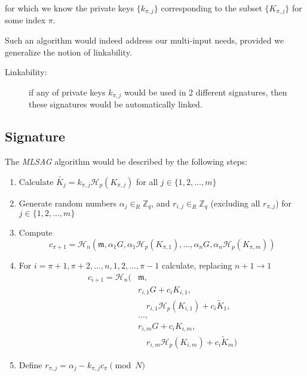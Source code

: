 for which we know
the private keys \(\{k_{\pi, j} \} \) corresponding to the subset \(\{K_{\pi, j}\} \) for some index \(\pi\). 

Such an algorithm would indeed address our multi-input needs, provided we generalize the notion of linkability.

\begin{description}
	\item[Linkability:] if any of private keys \(k_{\pi, j}\) would be used in 2 different signatures, then these signatures would be automatically linked.
\end{description}



\subsection*{Signature}

The {\em MLSAG} algorithm would be described by the following steps:

\begin{enumerate}
	
	\item Calculate \(\tilde{K_j} = k_{\pi, j} \mathcal{H}_p(K_{\pi, j})\) for all \(j \in \{1, 2, ..., m\}\)
	
	\item Generate random numbers  \(\alpha_j \in_R \mathbb{Z}_q\), and \(r_{i, j} \in_R \mathbb{Z}_q\) (excluding all \(r_{\pi, j}\)) for \(j \in \{1, 2, ..., m\}\) 
	
	\item Compute 
	\[
	c_{\pi+1} = \mathcal{H}_n(\mathfrak{m}, \alpha_1 G, \alpha_1 \mathcal{H}_p(K_{\pi, 1}), ..., \alpha_n G, \alpha_n \mathcal{H}_p(K_{\pi, m}))
	\]
	
	\item For \(i = \pi+1, \pi+2, ..., n, 1, 2, ..., \pi-1\) calculate, replacing \(n + 1 \rightarrow 1\)
	\begin{align*}
	  c_{i+1} = \mathcal{H}_n(&\mathfrak{m},\\
	                          & r_{i, 1} G + c_i K_{i, 1}, \\
	                          & \quad r_{i, 1} \mathcal{H}_p(K_{i, 1}) + c_i \tilde{K}_1,\\ 
	                          &..., \\
	                          & r_{i, m} G + c_i K_{i, m}, \\
	                          & \quad r_{i, m} \mathcal{H}_p(K_{i, m}) + c_i \tilde{K}_m)
	\end{align*} 
	
	
	\item Define \(r_{\pi, j} = \alpha_j -k_{\pi, j} c_\pi \pmod N\)
	
\end{enumerate}

